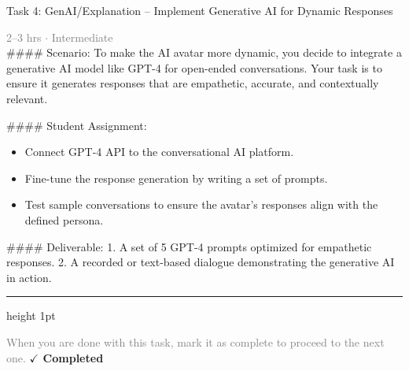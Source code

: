 \documentclass[10pt,a4paper]{article}
\begin{document}
\begin{taskbox}{Task 4: GenAI/Explanation – Implement Generative AI for Dynamic Responses}

    {\small \textcolor{gray}{2--3 hrs $\cdot$ Intermediate}}\\[12pt]

    \#\#\#\# Scenario:  
To make the AI avatar more dynamic, you decide to integrate a generative AI model like GPT-4 for open-ended conversations. Your task is to ensure it generates responses that are empathetic, accurate, and contextually relevant.  

\#\#\#\# Student Assignment:  
\begin{itemize}
    \item Connect GPT-4 API to the conversational AI platform.  
    \item Fine-tune the response generation by writing a set of prompts.  
    \item Test sample conversations to ensure the avatar’s responses align with the defined persona.  
\end{itemize}

\#\#\#\# Deliverable:  
1. A set of 5 GPT-4 prompts optimized for empathetic responses.  
2. A recorded or text-based dialogue demonstrating the generative AI in action.\par

    \vspace{16pt}

    \textcolor{cardBorder}{\hrule height 1pt}\vspace{8pt}

    \small \textcolor{gray}{When you are done with this task, mark it as complete to proceed to the next one.} \hfill \textbf{\textcolor{brandDark}{$\checkmark$ Completed}}

\end{taskbox}
\end{document}
